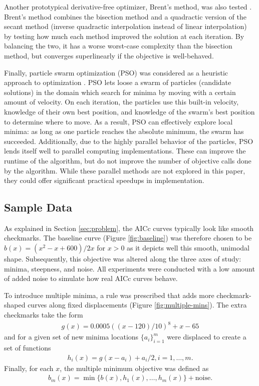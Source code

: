 \documentclass[letterpaper,12pt,twocolumn]{article}
\begin{document}
Another prototypical derivative-free optimizer, Brent's method, was also tested \cite{Brent1973}. Brent's method combines the bisection method and a quadractic version of the secant method (inverse quadractic interpolation instead of linear interpolation) by testing how much each method improved the solution at each iteration. By balancing the two, it has a worse worst-case complexity than the bisection method, but converges superlinearly if the objective is well-behaved.

Finally, particle swarm optimization (PSO) was considered as a heuristic approach to optimization \cite{Bonyadi2017}. PSO lets loose a swarm of particles (candidate solutions) in the domain which search for minima by moving with a certain amount of velocity. On each iteration, the particles use this built-in velocity, knowledge of their own best position, and knowledge of the swarm's best position to determine where to move. As a result, PSO can effectively explore local minima: as long as one particle reaches the absolute minimum, the swarm has succeeded. Additionally, due to the highly parallel behavior of the particles, PSO lends itself well to parallel computing implementations. These can improve the runtime of the algorithm, but do not improve the number of objective calls done by the algorithm. While these parallel methods are not explored in this paper, they could offer significant practical speedups in implementation.

\subsection{Sample Data}
As explained in Section \ref{sec:problem}, the AICc curves typically look like smooth checkmarks. The baseline curve (Figure \ref{fig:baseline}) was therefore chosen to be $b(x) = (x^2 - x + 600)/2x$ for $x > 0$ as it depicts well this smooth, unimodal shape. Subsequently, this objective was altered along the three axes of study: minima, steepness, and noise. All experiments were conducted with a low amount of added noise to simulate how real AICc curves behave.

To introduce multiple minima, a rule was prescribed that adds more checkmark-shaped curves along fixed displacements (Figure \ref{fig:multiple-mins}). The extra checkmarks take the form \begin{align*}
    g(x) = 0.0005((x-120)/10)^8 + x - 65
\end{align*} and for a given set of new minima locations $\{a_i\}_{i=1}^m$ were displaced to create a set of functions \begin{align*}
    h_i(x) = g(x - a_i) + a_i/2, i = 1, \dots, m.
\end{align*} Finally, for each $x$, the multiple minimum objective was defined as \begin{align*}
    b_m(x) = \min \{b(x), h_1(x), \dots, h_m(x)\} + \text{noise}.
\end{align*} 
\end{document}
